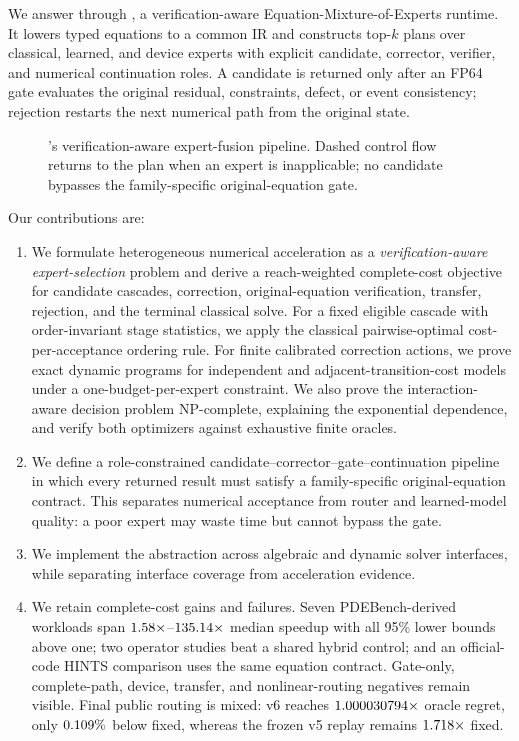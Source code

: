 We answer through \system, a verification-aware Equation-Mixture-of-Experts runtime.
It lowers typed equations to a common IR and constructs top-$k$ plans over classical,
learned, and device experts with explicit candidate, corrector, verifier, and numerical
continuation roles. A candidate is returned only after an FP64 gate evaluates the
original residual, constraints, defect, or event consistency; rejection restarts the
next numerical path from the original state.

\begin{figure}[t]
\centering
\resizebox{\columnwidth}{!}{}
\caption{\system's verification-aware expert-fusion pipeline. Dashed control flow
returns to the plan when an expert is inapplicable; no candidate bypasses the
family-specific original-equation gate.}
\label{fig:architecture}
\end{figure}

Our contributions are:

\begin{enumerate}
  \item We formulate heterogeneous numerical acceleration as a
  \emph{verification-aware expert-selection} problem and derive a reach-weighted
  complete-cost objective for candidate cascades, correction, original-equation
  verification, transfer, rejection, and the terminal classical solve. For a fixed eligible cascade with
  order-invariant stage statistics, we apply the classical pairwise-optimal
  cost-per-acceptance ordering rule. For finite calibrated correction actions, we
  prove exact dynamic programs for independent and adjacent-transition-cost models
  under a one-budget-per-expert constraint. We also prove the interaction-aware
  decision problem NP-complete, explaining the exponential dependence, and verify
  both optimizers against exhaustive finite oracles.

  \item We define a role-constrained candidate--corrector--gate--continuation pipeline
  in which every returned result must satisfy a family-specific original-equation
  contract. This separates numerical acceptance from router and learned-model quality:
  a poor expert may waste time but cannot bypass the gate.

  \item We implement the abstraction across algebraic and dynamic solver interfaces,
  while separating interface coverage from acceleration evidence.

  \item We retain complete-cost gains and failures. Seven PDEBench-derived workloads
  span $1.58\times$--$135.14\times$ median speedup with all
  95\% lower bounds above one; two operator studies beat a shared hybrid control; and
  an official-code HINTS comparison uses the same equation contract. Gate-only,
  complete-path, device, transfer, and nonlinear-routing negatives remain visible.
  Final public routing is mixed: v6 reaches $1.000030794\times$ oracle
  regret, only $0.109\%$ below fixed, whereas the frozen
  v5 replay remains $1.718\times$ fixed.
\end{enumerate}

